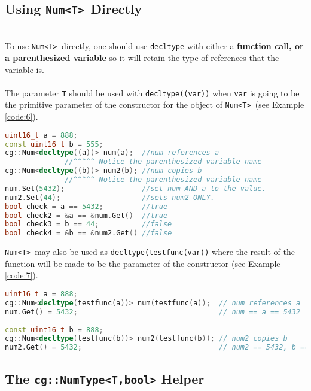 \documentclass{article}
\newcommand{\theobj}{\protect\Verb+Num<T> +}
\begin{document}
\subsection{Using \theobj Directly}
\hfill \\ \indent
To use \theobj directly, one should use \Verb+decltype+ with either a \textbf{function call, or a parenthesized variable} so it will retain the type of references that the variable is. 
\hfill \\ \hfill \\ 
\indent
The parameter \Verb+T+ should be used with \Verb+decltype((var))+ when \Verb+var+ is going to be the primitive parameter of the constructor for the object of \theobj (see Example \vref{code:6}).
\pagebreak
\begin{lstlisting}[language=C++, label=code:6, caption=Construct a \theobj with a varaible]
uint16_t a = 888;
const uint16_t b = 555;
cg::Num<decltype((a))> num(a);  //num references a
              //^^^^^ Notice the parenthesized variable name
cg::Num<decltype((b))> num2(b); //num copies b
              //^^^^^ Notice the parenthesized variable name
num.Set(5432);                  //set num AND a to the value.
num2.Set(44);                   //sets num2 ONLY.
bool check = a == 5432;         //true
bool check2 = &a == &num.Get()  //true
bool check3 = b == 44;          //false
bool check4 = &b == &num2.Get() //false
\end{lstlisting}
 \theobj may also be used as \Verb+decltype(testfunc(var))+ where the result of the function will be made to be the parameter of the constructor (see Example \vref{code:7}).
\begin{lstlisting}[language=C++, label=code:7, caption=\theobj and function decyltype]
uint16_t a = 888;                                 
cg::Num<decltype(testfunc(a))> num(testfunc(a));  // num references a
num.Get() = 5432;                                 // num == a == 5432
                                                  
const uint16_t b = 888;                           
cg::Num<decltype(testfunc(b))> num2(testfunc(b)); // num2 copies b
num2.Get() = 5432;                                // num2 == 5432, b == 888
\end{lstlisting}

\subsection{The \protect\Verb+cg::NumType<T,bool>+ Helper}
\end{document}
